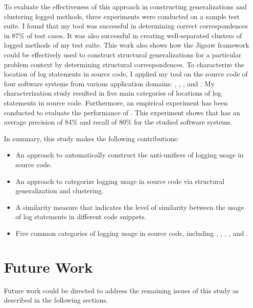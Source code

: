 To evaluate the effectiveness of this approach in constructing generalizations and clustering logged methods, three experiments were conducted on a sample test suite. I found that my tool was successful in determining correct correspondences in 87\% of test cases. It was also successful in creating well-separated clusters of logged methods of my test suite. This work also shows how the Jigsaw framework could be effectively used to construct structural generalizations for a particular problem context by determining structural correspondences. To characterize the location of log statements in source code, I applied my tool on the source code of four software systems from various application domains: , , , and . My characterization study resulted in five main categories of locations of log statements in source code. Furthermore, an empirical experiment has been conducted to evaluate the performance of . This experiment shows that  has an average precision of 84\% and recall of 80\% for the studied software systems.

In summary, this study makes the following contributions:
\begin{itemize} [leftmargin=.5in]
\item An approach to automatically construct the anti-unifiers of logging usage in source code.
\item An approach to categorize logging usage in source code via structural generalization and clustering.
\item A similarity measure that indicates the level of similarity between the usage of log statements in different code snippets.
\item Five common categories of logging usage in source code, including , , , , and .

\end{itemize}


\section{Future Work}  \label{fw}
Future work could be directed to address the remaining issues of this study as described in the following sections.


